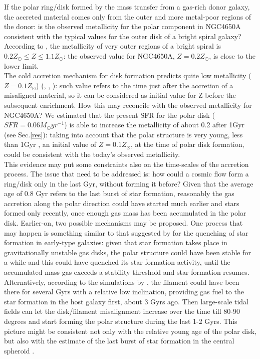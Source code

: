 \documentclass[12pt,preprint]{aastex}
\begin{document}
If the polar ring/disk formed by the mass transfer from a gas-rich
donor galaxy, the accreted material comes only from the outer and more
metal-poor regions of the donor: is the observed metallicity for the
polar component in NGC4650A consistent with the typical values for the
outer disk of a bright spiral galaxy? According to \citet{Bre09}, the
metallicity of very outer regions of a bright spiral is $0.2 Z_{\odot} \le Z \le
1.1 Z_{\odot}$: the observed value for NGC4650A, $Z=0.2Z_{\odot}$, is
close to the lower limit.\\ The cold accretion mechanism for disk
formation predicts quite low metallicity ($Z=0.1Z_{\odot}$)
(\citealt{Dek06}, \citealt{Ocv08}, \citealt{Age09}): such value refers
to the time just after the accretion of a misaligned material, so it
can be considered as initial value for Z before the subsequent
enrichment. How this may reconcile with the observed metallicity for
NGC4650A?  We estimated that the present SFR for the polar disk ($SFR
= 0.06 M_{\odot} yr^{-1}$) is able to increase the metallicity of
about 0.2 after 1Gyr (see Sec.\ref{res}): taking into account that the
polar structure is very young, less than 1Gyr \citep{Iod02}, an
initial value of $Z=0.1Z_{\odot}$, at the time of polar disk
formation, could be consistent with the today's observed
metallicity.\\ This evidence may put some constraints also on the
time-scales of the accretion process. The issue that need to be
addressed is: how could a cosmic flow form a ring/disk only in the
last Gyr, without forming it before?  Given that the average age of
0.8 Gyr refers to the last burst of star formation, reasonably the gas
accretion along the polar direction could have started much earlier
and stars formed only recently, once enough gas mass has been
accumulated in the polar disk. Earlier-on, two possible mechanisms may
be proposed. One process that may happen is something similar to that
suggested by \citet{Mar09} for the quenching of star formation in
early-type galaxies: given that star formation takes place in
gravitationally unstable gas disks, the polar structure could have
been stable for a while and this could have quenched its star
formation activity, until the accumulated mass gas exceeds a stability
threshold and star formation resumes. Alternatively, according to the
simulations by \citet{Bro08}, the filament could have been there for
several Gyrs with a relative low inclination, providing gas fuel to
the star formation in the host galaxy first, about 3 Gyrs ago. Then
large-scale tidal fields can let the disk/filament misalignment
increase over the time till 80-90 degrees and start forming the polar
structure during the last 1-2 Gyrs. This picture might be consistent
not only with the relative young age of the polar disk, but also with
the estimate of the last burst of star formation in the central
spheroid \citep{Iod02}.
\end{document}
